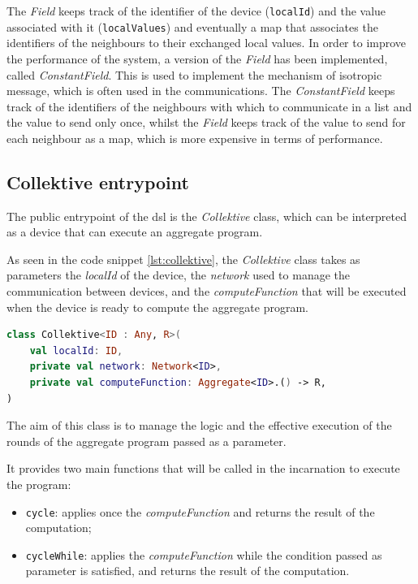 The \emph{Field} keeps track of the identifier of the device (\texttt{localId}) and the value associated with it
(\texttt{localValues}) and eventually a map that associates the identifiers of the neighbours to their exchanged local values.
In order to improve the performance of the system, a version of the \emph{Field} has been implemented, called \emph{ConstantField}.
This is used to implement the mechanism of isotropic message, which is often used in the communications.
The \emph{ConstantField} keeps track of the identifiers of the neighbours with which to communicate in a list and the value to send only once,
whilst the \emph{Field} keeps track of the value to send for each neighbour as a map, which is more expensive in terms of performance.

\subsection{Collektive entrypoint}
\label{subsec:collektive-entrypoint}
The public entrypoint of the \ac{dsl} is the \emph{Collektive} class, which can be interpreted as a device that can
execute an aggregate program.

As seen in the code snippet \ref{lst:collektive}, the \emph{Collektive} class takes as parameters the \emph{localId} of the device,
the \emph{network} used to manage the communication between devices, and the \emph{computeFunction} that will be executed
when the device is ready to compute the aggregate program.

\begin{lstlisting}[language=kt,label={lst:collektive}, caption={The signature of the \texttt{Collektive} class.}]
class Collektive<ID : Any, R>(
    val localId: ID,
    private val network: Network<ID>,
    private val computeFunction: Aggregate<ID>.() -> R,
)
\end{lstlisting}

The aim of this class is to manage the logic and the effective execution of the rounds of the aggregate program passed as a parameter.

It provides two main functions that will be called in the incarnation to execute the program:
\begin{itemize}
    \item \texttt{cycle}: applies once the \emph{computeFunction} and returns the result of the computation;
    \item \texttt{cycleWhile}: applies the \emph{computeFunction} while the condition passed as parameter is satisfied,
        and returns the result of the computation.
\end{itemize}

